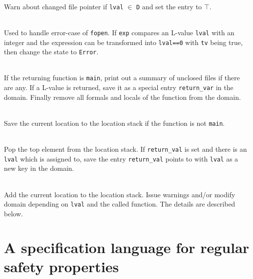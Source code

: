 \begin{description}
\item {}\\
Warn about changed file pointer if \verb|lval| $\in$ \verb|D| and set the entry to $\top$.

\item {}\\
Used to handle error-case of \verb|fopen|. If \verb|exp| compares an L-value \verb|lval| with an integer and the expression can be transformed into \verb|lval==0| with \verb|tv| being true, then change the state to \verb|Error|.


\item {}\\
If the returning function is \verb|main|, print out a summary of unclosed files if there are any.
If a L-value is returned, save it as a special entry \verb|return_var| in the domain.
Finally remove all formals and locals of the function from the domain.

\item {}\\
Save the current location to the location stack if the function is not \verb|main|.

\item {}\\
Pop the top element from the location stack. If \verb|return_val| is set and there is an \verb|lval| which is assigned to, save the entry \verb|return_val| points to with \verb|lval| as a new key in the domain.

\item {}\\
Add the current location to the location stack. Issue warnings and/or modify domain depending on \verb|lval| and the called function. The details are described below.
\end{description}



\chapter{A specification language for regular safety properties}
